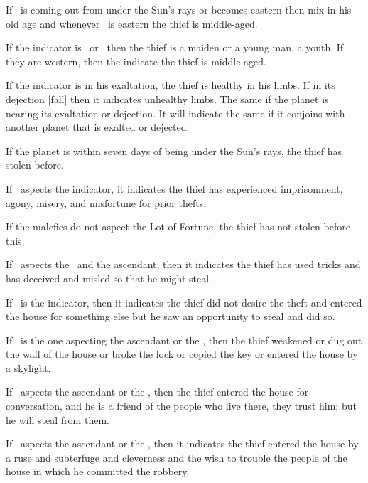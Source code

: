 If \Saturn\, is coming out from under the Sun's rays or becomes eastern then mix in his old age and whenever \Saturn\, is eastern the thief is middle-aged. 

If the indicator is \Mercury\, or \Venus\, then the thief is a maiden or a young man, a youth. If they are western, then the indicate the thief is middle-aged.

If the indicator is in his exaltation, the thief is healthy in his limbs. If in its dejection [fall] then it indicates unhealthy limbs. The same if the planet is nearing its exaltation or dejection. It will indicate the same if it conjoins with another planet that is exalted or dejected. 

If the planet is within seven days of being under the Sun's rays, the thief has stolen before.

If \Mars\, aspects the indicator, it indicates the thief has experienced imprisonment, agony, misery, and misfortune for prior thefts.

If the malefics do not aspect the Lot of Fortune, the thief has not stolen before this.

If \Saturn\, aspects the \Moon\, and the ascendant, then it indicates the thief has used tricks and has deceived and misled so that he might steal.

If \Jupiter\, is the indicator, then it indicates the thief did not desire the theft and entered the house for something else but he saw an opportunity to steal and did so.

If \Mars\, is the one aspecting the ascendant or the \Moon, then the thief weakened or dug out the wall of the house or broke the lock or copied the key or entered the house by a skylight.

If \Venus\, aspects the ascendant or the \Moon, then the thief entered the house for conversation, and he is a friend of the people who live there, they trust him; but he will steal from them.

If \Mercury\, aspects the ascendant or the \Moon, then it indicates the thief entered the house by a ruse and subterfuge and cleverness and the wish to trouble the people of the house in which he committed the robbery.





